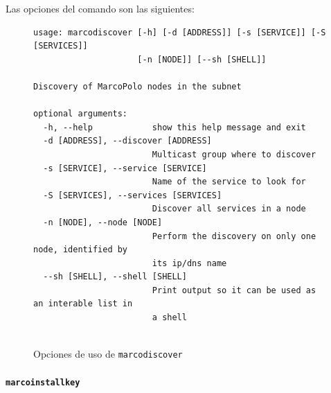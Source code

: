 Las opciones del comando son las siguientes:

\begin{figure}[H]
\centering



\begin{lstlisting}
usage: marcodiscover [-h] [-d [ADDRESS]] [-s [SERVICE]] [-S [SERVICES]]
                     [-n [NODE]] [--sh [SHELL]]

Discovery of MarcoPolo nodes in the subnet

optional arguments:
  -h, --help            show this help message and exit
  -d [ADDRESS], --discover [ADDRESS]
                        Multicast group where to discover
  -s [SERVICE], --service [SERVICE]
                        Name of the service to look for
  -S [SERVICES], --services [SERVICES]
                        Discover all services in a node
  -n [NODE], --node [NODE]
                        Perform the discovery on only one node, identified by
                        its ip/dns name
  --sh [SHELL], --shell [SHELL]
                        Print output so it can be used as an interable list in
                        a shell


\end{lstlisting}
\caption{Opciones de uso de \texttt{marcodiscover}}
\label{fig:marcodiscover_help}
\end{figure}

\paragraph{\texttt{marcoinstallkey}}
\label{marcoinstallkey}


